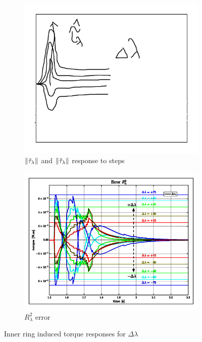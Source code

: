 \begin{figure}[hbtp]
\centering
\begin{subfigure}{0.49\textwidth}
\centering
\includegraphics[width=\textwidth]{graphs/tau-lambda-hat}
\caption{$\left\lVert\hat{\tau}_\lambda\right\rVert$ and $\left\lVert\tilde{\tau}_\lambda\right\rVert$ response to steps}
\label{fig:tau-lambda-hat}
\end{subfigure}
\begin{subfigure}{0.49\textwidth}
\includegraphics[width=\textwidth]{graphs/tau-lambda-hat-r}
\caption{$R^2_\lambda$ error}
\label{fig:tau-lambda-hat-r}
\end{subfigure}
\caption{Inner ring induced torque responses for $\Delta\lambda$}
\vspace{-6pt}
\label{fig:tau-lambda-sim}
\vspace{-10pt}
\end{figure}
